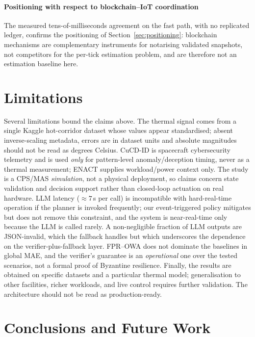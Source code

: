 \documentclass[preprint,11pt]{elsarticle}
\begin{document}
\paragraph{Positioning with respect to blockchain--IoT coordination}
The measured tens-of-milliseconds agreement on the fast path, with no
replicated ledger, confirms the positioning of
Section~\ref{sec:positioning}: blockchain mechanisms are complementary
instruments for notarising validated snapshots, not competitors for the
per-tick estimation problem, and are therefore not an estimation
baseline here.

\section{Limitations}
\label{sec:limitations}

Several limitations bound the claims above. The thermal signal comes from
a single Kaggle hot-corridor dataset whose values appear standardised;
absent inverse-scaling metadata, errors are in dataset units and absolute
magnitudes should not be read as degrees Celsius. CuCD-ID is spacecraft
cybersecurity telemetry and is used \emph{only} for pattern-level
anomaly/deception timing, never as a thermal measurement; ENACT supplies
workload/power context only. The study is a CPS/MAS \emph{simulation},
not a physical deployment, so claims concern state validation and
decision support rather than closed-loop actuation on real hardware. LLM
latency ($\approx 7$\,s per call) is incompatible with hard-real-time
operation if the planner is invoked frequently; our event-triggered
policy mitigates but does not remove this constraint, and the system is
near-real-time only because the LLM is called rarely. A non-negligible
fraction of LLM outputs are JSON-invalid, which the fallback handles but
which underscores the dependence on the verifier-plus-fallback layer.
FPR--OWA does not dominate the baselines in global MAE, and the
verifier's guarantee is an \emph{operational} one over the tested
scenarios, not a formal proof of Byzantine resilience. Finally, the
results are obtained on specific datasets and a particular thermal model;
generalisation to other facilities, richer workloads, and live control
requires further validation. The architecture should not be read as
production-ready.

\section{Conclusions and Future Work}
\label{sec:conclusions}
\end{document}
